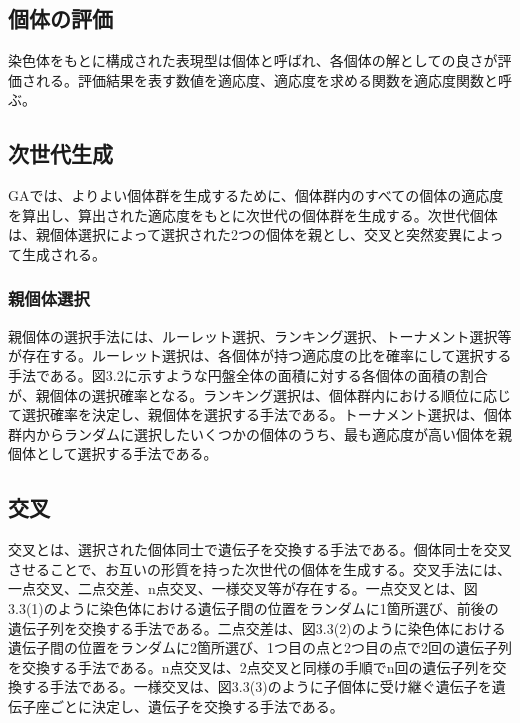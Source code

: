 \subsection{個体の評価}
染色体をもとに構成された表現型は個体と呼ばれ、各個体の解としての良さが評価される。評価結果を表す数値を適応度、適応度を求める関数を適応度関数と呼ぶ。

\subsection{次世代生成}
GAでは、よりよい個体群を生成するために、個体群内のすべての個体の適応度を算出し、算出された適応度をもとに次世代の個体群を生成する。次世代個体は、親個体選択によって選択された2つの個体を親とし、交叉と突然変異によって生成される。

\subsubsection{親個体選択}
親個体の選択手法には、ルーレット選択、ランキング選択、トーナメント選択等が存在する。ルーレット選択は、各個体が持つ適応度の比を確率にして選択する手法である。図3.2に示すような円盤全体の面積に対する各個体の面積の割合が、親個体の選択確率となる。ランキング選択は、個体群内における順位に応じて選択確率を決定し、親個体を選択する手法である。トーナメント選択は、個体群内からランダムに選択したいくつかの個体のうち、最も適応度が高い個体を親個体として選択する手法である。

\subsection{交叉}
交叉とは、選択された個体同士で遺伝子を交換する手法である。個体同士を交叉させることで、お互いの形質を持った次世代の個体を生成する。交叉手法には、一点交叉、二点交差、n点交叉、一様交叉等が存在する。一点交叉とは、図3.3(1)のように染色体における遺伝子間の位置をランダムに1箇所選び、前後の遺伝子列を交換する手法である。二点交差は、図3.3(2)のように染色体における遺伝子間の位置をランダムに2箇所選び、1つ目の点と2つ目の点で2回の遺伝子列を交換する手法である。n点交叉は、2点交叉と同様の手順でn回の遺伝子列を交換する手法である。一様交叉は、図3.3(3)のように子個体に受け継ぐ遺伝子を遺伝子座ごとに決定し、遺伝子を交換する手法である。

